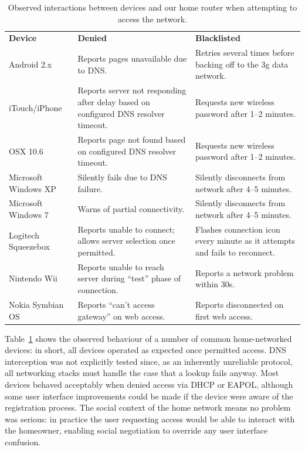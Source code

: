 \begin{table} \centering\footnotesize
  \begin{tabular}{lp{}p{}} \bf Device & \bf Denied &
    \bf Blacklisted\\

Android 2.x & Reports pages unavailable due to DNS.  & Retries several times
before backing off to the 3g data network.\\

iTouch/iPhone & Reports server not responding after delay based on configured
DNS resolver timeout.  & Requests new wireless password after 1--2 minutes.\\

OSX 10.6 & Reports page not found based on configured DNS resolver timeout.  &
Requests new wireless password after 1--2 minutes.\\

Microsoft Windows XP & Silently fails due to DNS failure.  & Silently
disconnects from network after 4--5 minutes.\\

Microsoft Windows 7 & Warns of partial connectivity.  & Silently disconnects
from network after 4--5 minutes.\\

Logitech Squeezebox & Reports unable to connect; allows server selection once
permitted.  & Flashes connection icon every minute as it attempts and fails to
reconnect.  \\ 

Nintendo Wii & Reports unable to reach server during ``test'' phase of
connection.  & Reports a network problem within 30s.\\

Nokia Symbian OS & Reports ``can't access gateway'' on web access.  & Reports
disconnected on first web access.\\ \end{tabular}
\caption{\label{t:devices}Observed interactions between devices and our home
  router when attempting to access the network.} \vspace{-3.5em} \end{table}

Table~\ref{t:devices} shows the observed behaviour of a number of common
home-networked devices: in short, all devices operated as expected once
permitted access.  DNS interception was not explicitly tested since, as an
inherently unreliable protocol, all networking stacks must handle the case that
a lookup fails anyway.  Most devices behaved acceptably when denied access via
DHCP or EAPOL, although some user interface improvements could be made if the
device were aware of the registration process.  The social context of the home
network means no problem was serious: in practice the user requesting access
would be able to interact with the homeowner, enabling social negotiation to
override any user interface confusion. 


